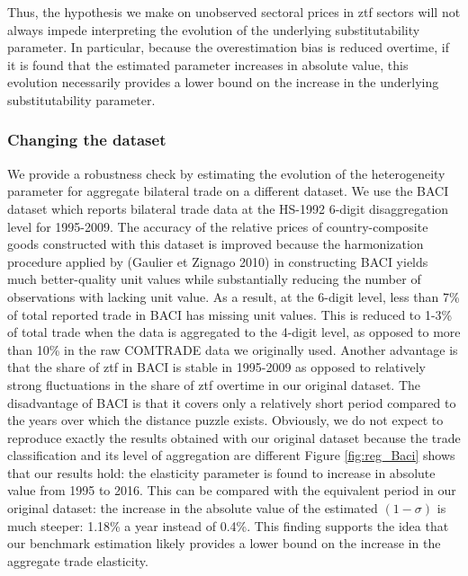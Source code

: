 \documentclass[12pt,twoside,a4paper,notitlepage]{article}
\begin{document}
{	\label{ref-006}
	
	
	
	
	
	Thus, the hypothesis we make on unobserved sectoral prices in ztf sectors will not always impede interpreting the evolution of the underlying substitutability parameter.
	In particular, because the overestimation bias is reduced overtime, if it is found that the estimated parameter increases in absolute value, this evolution necessarily provides a lower bound on the increase in the underlying substitutability parameter.
	


\subsubsection{Changing the dataset\label{baci}}


We provide a robustness check by estimating the evolution of the heterogeneity parameter for aggregate bilateral trade on a different dataset.
We use the BACI dataset which reports bilateral trade data at the HS-1992 6-digit disaggregation level for 1995-2009.
The accuracy of the relative prices of country-composite goods constructed with this dataset is improved because the harmonization procedure applied by (Gaulier et Zignago 2010) in constructing BACI yields much better-quality unit values while substantially reducing the number of observations with lacking unit value.
As a result, at the 6-digit level, less than 7\% of total reported trade in BACI has missing unit values.
This is reduced to 1-3\% of total trade when the data is aggregated to the 4-digit level, as opposed to more than 10\% in the raw COMTRADE data we originally used.
Another advantage is that the share of ztf in BACI is stable in 1995-2009 as opposed to relatively strong fluctuations in the share of ztf overtime in our original dataset.
The disadvantage of BACI is that it covers only a relatively short period compared to the years over which the distance puzzle exists.
Obviously, we do not expect to reproduce exactly the results obtained with our original dataset because the trade classification and its level of aggregation are different
Figure \ref{fig:reg_Baci} shows that our results hold: the elasticity parameter is found to increase in absolute value from 1995 to 2016.
This can be compared with the equivalent period in our original dataset: the increase in the absolute value of the estimated $\left(1-\sigma \right)$ is much steeper: 1.18\% a year instead of 0.4\%.
This finding supports the idea that our benchmark estimation likely provides a lower bound on the increase in the aggregate trade elasticity.

}
\end{document}
